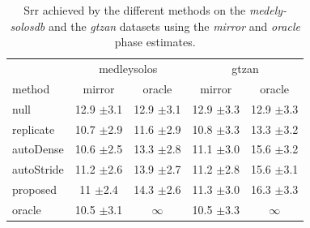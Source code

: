\documentclass{article}
\begin{document}
\begin{table}
  \begin{center}
\begin{tabular}{lcc|cc}
  & \multicolumn{2}{c}{medleysolos} & \multicolumn{2}{c}{gtzan} \\
  method & mirror & oracle & mirror & oracle \\
\hline
null & 12.9 $\pm$3.1 & 12.9 $\pm$3.1 & 12.9 $\pm$3.3 &  12.9 $\pm$3.3\\
replicate & 10.7 $\pm$2.9 & 11.6 $\pm$2.9 & 10.8 $\pm$3.3 & 13.3 $\pm$3.2\\
\hline
autoDense & 10.6 $\pm$2.5 &  13.3 $\pm$2.8 & 11.1 $\pm$3.0 & 15.6 $\pm$3.2 \\
autoStride & 11.2 $\pm$2.6 & 13.9 $\pm$2.7 & 11.2 $\pm$2.8 & 15.6 $\pm$3.1 \\
\hline
proposed  & 11 $\pm$2.4 & 14.3 $\pm$2.6  & 11.3 $\pm$3.0 & 16.3 $\pm$3.3 \\
\hline
oracle & 10.5 $\pm$3.1 & $\infty$ & 10.5 $\pm$3.3 & $\infty$ \\
\end{tabular}
\caption{Srr achieved by the different methods on the \textit{medely-solosdb} and the \textit{gtzan} datasets using the \textit{mirror} and \textit{oracle} phase estimates.}
\label{tab:srr}
\end{center}
\vspace{-4mm}
\end{table}

\end{document}
